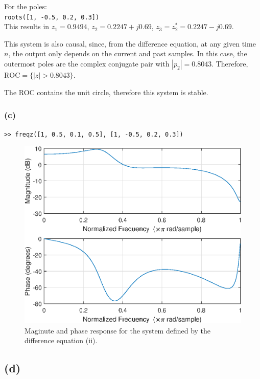 \documentclass{article}
\begin{document}
\noindent For the poles:\\
\texttt{roots([1, -0.5, 0.2, 0.3])}\\
This results in $z_1 = 0.9494$, $z_2 = 0.2247 + j0.69$, $z_3 = z_2^* = 0.2247 -j0.69$.

This system is also causal, since, from the difference equation, at any given time $n$, the output only depends on the current and past samples. In this case, the outermost poles are the complex conjugate pair with $|p_2| = 0.8043$. Therefore, $\mathrm{ROC} = \{|z| > 0.8043\}$.

The ROC contains the unit circle, therefore this system is stable.

\begin{center}
	\resizebox{0.5\linewidth}{!}{}
\end{center}

\subsubsection{(c)}
\texttt{>> freqz([1, 0.5, 0.1, 0.5], [1, -0.5, 0.2, 0.3])}

\begin{figure}[h!]
	\centering
	\includegraphics[scale=0.7]{figs/hw01q1c_freqz2.eps}
	\caption{Maginute and phase response for the system defined by the difference equation (ii).}
\end{figure}

\subsection{(d)}
\end{document}
